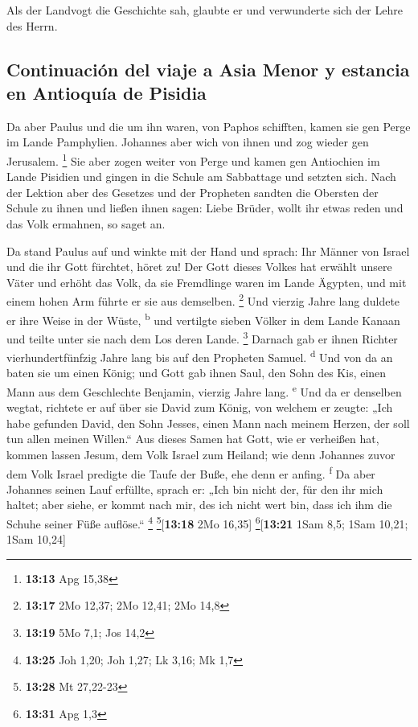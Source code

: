  Als der Landvogt die Geschichte sah, glaubte er und
verwunderte sich der Lehre des Herrn.

\hypertarget{continuaciuxf3n-del-viaje-a-asia-menor-y-estancia-en-antioquuxeda-de-pisidia}{%
\subsection{Continuación del viaje a Asia Menor y estancia en Antioquía
de
Pisidia}\label{continuaciuxf3n-del-viaje-a-asia-menor-y-estancia-en-antioquuxeda-de-pisidia}}

 Da aber Paulus und die um ihn waren, von Paphos
schifften, kamen sie gen Perge im Lande Pamphylien. Johannes aber wich
von ihnen und zog wieder gen Jerusalem. \footnote{\textbf{13:13} Apg
  15,38}  Sie aber zogen weiter von Perge und kamen gen
Antiochien im Lande Pisidien und gingen in die Schule am Sabbattage und
setzten sich.  Nach der Lektion aber des Gesetzes und der
Propheten sandten die Obersten der Schule zu ihnen und ließen ihnen
sagen: Liebe Brüder, wollt ihr etwas reden und das Volk ermahnen, so
saget an.

 Da stand Paulus auf und winkte mit der Hand und sprach:
Ihr Männer von Israel und die ihr Gott fürchtet, höret zu!
 Der Gott dieses Volkes hat erwählt unsere Väter und
erhöht das Volk, da sie Fremdlinge waren im Lande Ägypten, und mit einem
hohen Arm führte er sie aus demselben. \footnote{\textbf{13:17} 2Mo
  12,37; 2Mo 12,41; 2Mo 14,8}  Und vierzig Jahre lang
duldete er ihre Weise in der Wüste, \textsuperscript{b} 
und vertilgte sieben Völker in dem Lande Kanaan und teilte unter sie
nach dem Los deren Lande. \footnote{\textbf{13:19} 5Mo 7,1; Jos 14,2}
 Darnach gab er ihnen Richter vierhundertfünfzig Jahre
lang bis auf den Propheten Samuel. \textsuperscript{d} 
Und von da an baten sie um einen König; und Gott gab ihnen Saul, den
Sohn des Kis, einen Mann aus dem Geschlechte Benjamin, vierzig Jahre
lang. \textsuperscript{e}  Und da er denselben wegtat,
richtete er auf über sie David zum König, von welchem er zeugte: „Ich
habe gefunden David, den Sohn Jesses, einen Mann nach meinem Herzen, der
soll tun allen meinen Willen.``  Aus dieses Samen hat
Gott, wie er verheißen hat, kommen lassen Jesum, dem Volk Israel zum
Heiland;  wie denn Johannes zuvor dem Volk Israel
predigte die Taufe der Buße, ehe denn er anfing. \textsuperscript{f}
 Da aber Johannes seinen Lauf erfüllte, sprach er: „Ich
bin nicht der, für den ihr mich haltet; aber siehe, er kommt nach mir,
des ich nicht wert bin, dass ich ihm die Schuhe seiner Füße auflöse.``
\footnote{\textbf{13:25} Joh 1,20; Joh 1,27; Lk 3,16; Mk 1,7}
\footnote{\textbf{13:28} Mt 27,22-23}{[}\textbf{13:18} 2Mo 16,35{]}
\footnote{\textbf{13:31} Apg 1,3}{[}\textbf{13:21} 1Sam 8,5; 1Sam 10,21;
1Sam 10,24{]}

